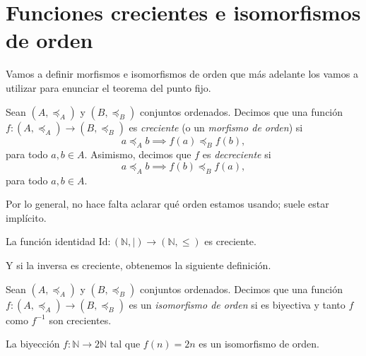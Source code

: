\section{Funciones crecientes e isomorfismos de orden}

Vamos a definir morfismos e isomorfismos de orden que más adelante los vamos a utilizar para enunciar el teorema del punto fijo.

\begin{definition}
	Sean $(A, \preceq_A)$ y $(B, \preceq_B)$ conjuntos ordenados. Decimos que una función $f : (A, \preceq_A) \to (B, \preceq_B)$ es \emph{creciente} (o un \emph{morfismo de orden}) si
	\begin{equation*}
		a \preceq_A b \implies f(a) \preceq_B f(b),
	\end{equation*}
	para todo $a, b \in A$. Asimismo, decimos que $f$ es \emph{decreciente} si
	\begin{equation*}
		a \preceq_A b \implies f(b) \preceq_B f(a),
	\end{equation*}
	para todo $a, b \in A$.
\end{definition}

Por lo general, no hace falta aclarar qué orden estamos usando; suele estar implícito.

\begin{example}
	La función identidad $\mathrm{Id} : (\mathbb{N}, \mid) \to (\mathbb{N}, \leq)$ es creciente.
\end{example}

Y si la inversa es creciente, obtenemos la siguiente definición.

\begin{definition}
	Sean $(A, \preceq_A)$ y $(B, \preceq_B)$ conjuntos ordenados. Decimos que una función $f : (A, \preceq_A) \to (B, \preceq_B)$ es un \emph{isomorfismo de orden} si es biyectiva y tanto $f$ como $f^{-1}$ son crecientes.
\end{definition}

\begin{example}
	La biyección $f : \mathbb{N} \to 2\mathbb{N}$ tal que $f(n) = 2n$ es un isomorfismo de orden.
\end{example}